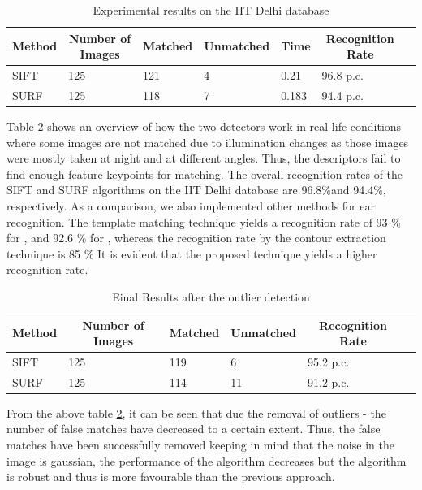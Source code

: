 \begin{table}[]
\centering
\caption{Experimental results on the IIT Delhi database}
\label{table2}
\begin{tabular}{lllllll}
\hline
\multicolumn{1}{c}{Method} &           
\multicolumn{1}{c}{Number of Images} &          
\multicolumn{1}{c}{Matched } &     
\multicolumn{1}{c}{Unmatched } &     
\multicolumn{1}{c}{Time} &     
\multicolumn{1}{c}{Recognition Rate} &     \\ \cline{1-2}
\hline
SIFT  & 125  & 121  & 4 & 0.21 & 96.8 p.c.  \\
\hline
SURF & 125  & 118  & 7 & 0.183 & 94.4 p.c.    \\
 \hline

\end{tabular}
\end{table}

Table 2 shows an overview of how the two detectors work in real-life conditions where some images are not matched due to illumination changes as those images were mostly taken at night and at different angles. Thus, the descriptors fail to find enough feature keypoints for matching. The overall recognition rates of the SIFT and SURF algorithms on the IIT Delhi database are 96.8{\%}and 94.4{\%}, respectively. As a comparison, we also implemented other methods for ear recognition. The template matching technique yields a recognition rate of 93 {\%} for \cite{ansari}, and 92.6 {\%} for \cite{birbhanu}, whereas the recognition rate by the contour extraction technique \cite{bowyer} is 85 {\%} It is evident that the proposed technique yields a higher recognition rate.

\begin{table}[]
\centering
\caption{Einal Results after the outlier detection}
\label{table3}
\begin{tabular}{llllll}
\hline
\multicolumn{1}{c}{Method} &           
\multicolumn{1}{c}{Number of Images} &          
\multicolumn{1}{c}{Matched } &     
\multicolumn{1}{c}{Unmatched } &        
\multicolumn{1}{c}{Recognition Rate} &     \\ \cline{1-2}
\hline
SIFT  & 125  & 119  & 6  & 95.2 p.c.  \\
\hline
SURF & 125  & 114  & 11  & 91.2 p.c.    \\
 \hline

\end{tabular}
\end{table}

From the above table \ref{table3}, it can be seen that due the removal of outliers - the number of false matches have decreased to a certain extent. Thus, the false matches have been successfully removed keeping in mind that the noise in the image is gaussian, the performance of the algorithm decreases but the algorithm is robust and thus is more favourable than the previous approach.

